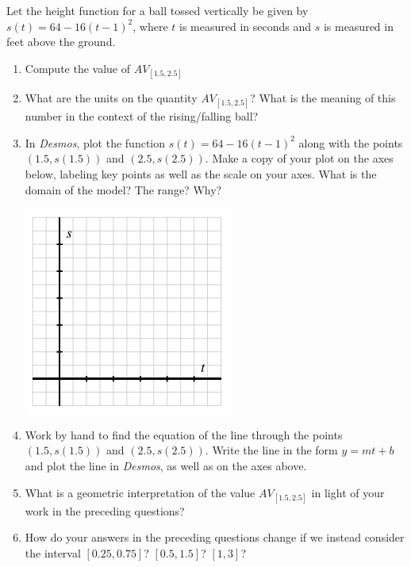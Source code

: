 \documentclass[nooutcomes]{ximera}
\begin{document}
\begin{exploration}
Let the height function for a ball tossed vertically be given by \(s(t) = 64 - 16(t-1)^2\), where \(t\) is measured in seconds and \(s\) is measured in feet above the ground.
\begin{enumerate}[label=\alph*.]
\item Compute the value of \(AV_{[1.5,2.5]}\)
\item What are the units on the quantity \(AV_{[1.5,2.5]}\)? What is the meaning of this number in the context of the rising/falling ball?
\item In \emph{Desmos}, plot the function \(s(t) = 64 - 16(t-1)^2\) along with the points \((1.5,s(1.5))\) and \((2.5, s(2.5))\). Make a copy of your plot on the axes below, labeling key points as well as the scale on your axes. What is the domain of the model? The range? Why?
\begin{image}
\includegraphics{ARoCtext1.jpg}
\end{image}
\item Work by hand to find the equation of the line through the points \((1.5,s(1.5))\) and \((2.5, s(2.5))\). Write the line in the form \(y = mt + b\) and plot the line in \emph{Desmos}, as well as on the axes above.
\item What is a geometric interpretation of the value \(AV_{[1.5,2.5]}\) in light of your work in the preceding questions?
\item How do your answers in the preceding questions change if we instead consider the interval \([0.25, 0.75]\)? \([0.5, 1.5]\)? \([1,3]\)?
\end{enumerate}
\end{exploration}


\end{document}
